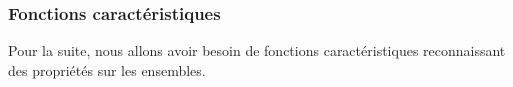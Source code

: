 \documentclass[a4paper, 11pt]{article}
\begin{document}
\subsubsection{Fonctions caractéristiques}

Pour la suite, nous allons avoir besoin de fonctions
 caractéristiques reconnaissant des propriétés sur les ensembles.


\def\transitif{\mbox{\scriptsize\bfseries T}}
\def\nottransitif{\mbox{\scriptsize\bfseries $\overline{T}$}}
\def\ordinal{\mbox{\scriptsize\bfseries O}}
\def\limite{\mbox{\scriptsize\bfseries $\infty ?$}}
\def\isomega{\mbox{\scriptsize\bfseries $\omega ?$}}
\def\extractomega{\mbox{\scriptsize\bfseries $\overset{\downarrow}{\omega}$}}
\def\logomega{\mbox{\scriptsize\bfseries $log_{\omega}$}}
\def\formenormale{\mbox{\scriptsize\bfseries FN}}
\def\issingleton{\mbox{\scriptsize\bfseries \kern-1pt{\{.\}}\adjustbox{lap=-1.85\width, raise=0.35em}{?}}}
\def\ispair{\mbox{\scriptsize\bfseries \kern-1pt{\{..\}}\adjustbox{lap=-2\width, raise=0.35em}{?}}}
\def\iscouple{\mbox{\scriptsize\bfseries \kern-1pt{(..)}\adjustbox{lap=-1.9\width, raise=0.35em}{?}}}
\def\getfirst{\mbox{\scriptsize\bfseries \kern-1pt{(..)}\adjustbox{lap=-2.3\width, raise=0.35em}{$\downarrow$}}}
\def\getsecond{\mbox{\scriptsize\bfseries \kern-1pt{(..)}\adjustbox{lap=-1.7\width, raise=0.35em}{$\downarrow$}}}
\end{document}
